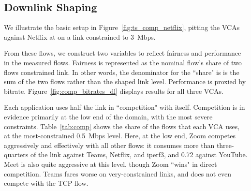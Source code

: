 
\subsection{Downlink Shaping}

We illustrate the basic setup in Figure~\ref{fig:ts_comp_netflix}, 
  pitting the VCAs against Netflix at on a link constrained to 3~Mbps.

From these flows, we construct two variables
  to reflect fairness and performance in the measured flows.
Fairness is represented 
  as the nominal flow's share of two flows constrained link.
In other words, the denominator for the ``share" is
  is the sum of the two flows rather than 
  the shaped link level.
Performance is proxied by bitrate.
Figure~\ref{fig:comp_bitrates_dl}
  displays results for all three VCAs.


Each application uses half the link in ``competition" with itself.
Competition is in evidence primarily at the low end of the domain,
  with the most severe constraints.
Table~\ref{tab:comp} shows the share
  of the flows that each VCA uses,
  at the most-constrained 0.5~Mbps level.
Here, at the low end, Zoom competes
  aggressively and effectively with all other flows:
  it consumes more than three-quarters of the link against Teams, Netflix, and iperf3, 
  and 0.72 against YouTube.
Meet is also quite aggressive at this level, 
  though Zoom ``wins" in direct competition.
Teams fares worse on very-constrained links,
  and does not even compete with the TCP flow.
  

